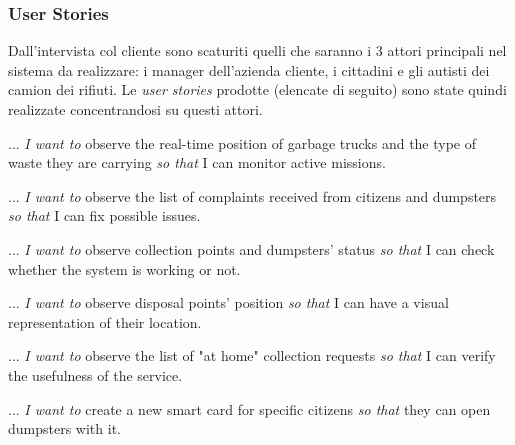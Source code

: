 

\subsubsection{User Stories}
Dall'intervista col cliente sono scaturiti quelli che saranno i 3 attori principali nel sistema da realizzare: i manager dell'azienda cliente, i cittadini e gli autisti dei camion dei rifiuti. Le \textit{user stories} prodotte (elencate di seguito) sono state quindi realizzate concentrandosi su questi attori.

\begin{story}
    ... \textit{I want to} observe the real-time position of garbage trucks and the type of waste they are carrying \textit{so that} I can monitor active missions.
\end{story}
\begin{story}
    ... \textit{I want to} observe the list of complaints received from citizens and dumpsters \textit{so that} I can fix possible issues.
\end{story}
\begin{story}
    ... \textit{I want to} observe collection points and dumpsters' status \textit{so that} I can check whether the system is working or not.
\end{story}
\begin{story}
    ... \textit{I want to} observe disposal points' position \textit{so that} I can have a visual representation of their location.
\end{story}
\begin{story}
    ... \textit{I want to} observe the list of "at home" collection requests \textit{so that} I can verify the usefulness of the service.
\end{story}
\begin{story}
    ... \textit{I want to} create a new smart card for specific citizens \textit{so that} they can open dumpsters with it.
\end{story}

